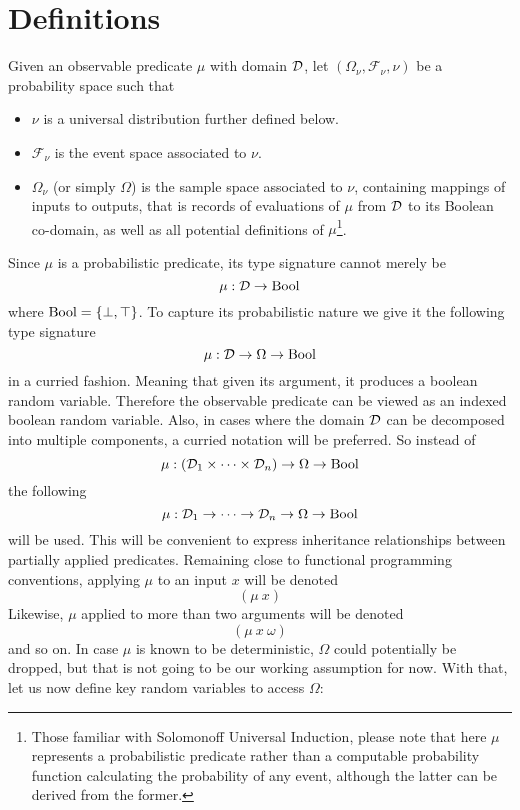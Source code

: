 \documentclass[]{article}
\begin{document}
\section{Definitions}
Given an observable predicate $\mu$ with domain $\mathcal{D}$, let
$(\Omega_\nu, \mathcal{F_\nu}, \nu)$ be a probability space such that
\begin{itemize}
\item $\nu$ is a universal distribution further defined below.
\item $\mathcal{F_\nu}$ is the event space associated to $\nu$.
\item $\Omega_\nu$ (or simply $\Omega$) is the sample space associated
  to $\nu$, containing mappings of inputs to outputs, that is records
  of evaluations of $\mu$ from $\mathcal{D}$ to its Boolean co-domain, as
  well as all potential definitions of $\mu$\footnote{Those familiar
  with Solomonoff Universal Induction, please note that here $\mu$
  represents a probabilistic predicate rather than a computable
  probability function calculating the probability of any event,
  although the latter can be derived from the former.}.
\end{itemize}
Since $\mu$ is a probabilistic predicate, its type signature cannot
merely be
$$\mu : \mathcal{D} \to \textup{Bool}$$ where $\textup{Bool} = \{\bot, \top\}$.  To capture
its probabilistic nature we give it the following type signature
$$\mu : \mathcal{D} \to \Omega \to \textup{Bool}$$ in a curried fashion.  Meaning
that given its argument, it produces a boolean random variable.
Therefore the observable predicate can be viewed as an indexed boolean
random variable.  Also, in cases where the domain $\mathcal{D}$ can be
decomposed into multiple components, a curried notation will be
preferred.  So instead of
$$\mu : (\mathcal{D}_1 \times \dots \times \mathcal{D}_n) \to \Omega \to \textup{Bool}$$
the following
$$\mu : \mathcal{D}_1 \to \dots \to \mathcal{D}_n \to \Omega \to \textup{Bool}$$ will
be used.  This will be convenient to express inheritance relationships
between partially applied predicates.  Remaining close to functional
programming conventions, applying $\mu$ to an input $x$ will be
denoted
$$(\mu\ x)$$ Likewise, $\mu$ applied to more than two arguments will
be denoted
$$(\mu\ x\ \omega)$$ and so on.
In case $\mu$ is known to be deterministic, $\Omega$ could
potentially be dropped, but that is not going to be our working
assumption for now.  With that, let us now define key random variables
to access $\Omega$:
\end{document}
